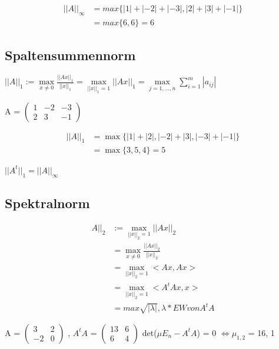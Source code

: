 \documentclass[12pt,a4paper]{article} %
\begin{document}
	\begin{equation*}
		\begin{split}		
			||A||_\infty & = max\{|1| + |-2| + |-3|, |2| + |3| + |-1|\} \\
			& = max\{6, 6\} = 6
		\end{split}
	\end{equation*}
	
	\subsection{Spaltensummennorm}
	
	$||A||_1 := \max\limits_{x \ne 0} \frac{||Ax||_1}{||x||_1} = \max\limits_{||x||_1 = 1} ||Ax||_1 = \max\limits_{j = 1, ..., n} \sum\limits_{i = 1}^{m}|a_{ij}|$
	
	A = 
	$\begin{pmatrix}
		1 & -2 & -3 \\
		2 & 3 & -1
	\end{pmatrix}$
	
	\begin{equation*}
		\begin{split}		
			||A||_1 & = \max\{|1| + |2|, |-2| + |3|, |-3| + |-1|\}  \\
			& = \max\{3, 5, 4\} = 5
		\end{split}
	\end{equation*}
	
	$||A^t||_1 = ||A||_\infty$
	
	\subsection{Spektralnorm}

	\begin{equation*}
		\begin{split}
			A||_2 &:= \max\limits_{||x||_2 = 1} ||Ax||_2 \\
			&= \max\limits_{x \ne 0} \frac{||Ax||_2}{||x||_2} \\
			&= \max\limits_{||x||_2 = 1} <Ax, Ax> \\
			&= \max\limits_{||x||_2 = 1} <A^tAx, x> \\
			&= max{\sqrt{|\lambda |}, \lambda * EW von A^tA}
		\end{split}
	\end{equation*}
	
	A = 
	$\begin{pmatrix}
		3 & 2 \\
		-2 & 0 
	\end{pmatrix}$
	, $A^tA$ = 
	$\begin{pmatrix}
		13 & 6 \\
		6 & 4 
	\end{pmatrix}$
	det($\mu E_n - A^tA$) = 0 $\Leftrightarrow \mu_{1, 2}$ = {16, 1}
	
\end{document}
